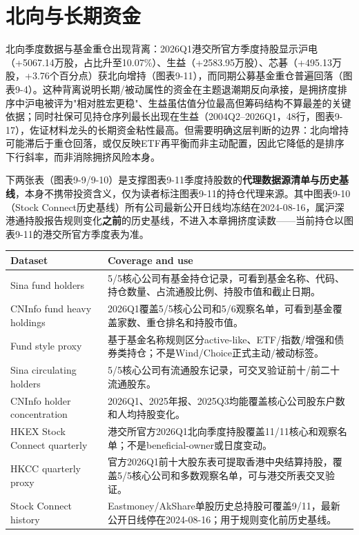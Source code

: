 \section{北向与长期资金}

北向季度数据与基金重仓出现背离：2026Q1港交所官方季度持股显示沪电（+5067.14万股，占比升至10.07\%）、生益（+2583.95万股）、芯碁（+495.13万股，+3.76个百分点）获北向增持（图表9-11），而同期公募基金重仓普遍回落（图表9-4）。这种背离说明长期/被动属性的资金在主题退潮期反向承接，是拥挤度排序中沪电被评为"相对胜宏更稳"、生益虽估值分位最高但筹码结构不算最差的关键依据；同时社保可见持仓序列最长出现在生益（2004Q2–2026Q1，48行，图表9-17），佐证材料龙头的长期资金粘性最高。但需要明确这层判断的边界：北向增持可能滞后于重仓回落，或仅反映ETF再平衡而非主动配置，因此它降低的是排序下行斜率，而非消除拥挤风险本身。

下两张表（图表9-9/9-10）是支撑图表9-11季度持股数的\textbf{代理数据源清单与历史基线}，本身不携带投资含义，仅为读者标注图表9-11的持仓代理来源。其中图表9-10（Stock Connect历史基线）所有公司最新公开日线均冻结在2024-08-16，属沪深港通持股报告规则变化\textbf{之前}的历史基线，不进入本章拥挤度读数——当前持仓以图表9-11的港交所官方季度表为准。

\begin{exhibitbox}
\small
\begin{tabularx}{\textwidth}{L{2.4cm}X}
\toprule
\textbf{Dataset} & \textbf{Coverage and use} \\
\midrule
Sina fund holders & 5/5核心公司有基金持仓记录，可看到基金名称、代码、持仓数量、占流通股比例、持股市值和截止日期。 \\
CNInfo fund heavy holdings & 2026Q1覆盖5/5核心公司和5/6观察名单，可看到基金覆盖家数、重仓排名和持股市值。 \\
Fund style proxy & 基于基金名称规则区分active-like、ETF/指数/增强和债券类持仓；不是Wind/Choice正式主动/被动标签。 \\
Sina circulating holders & 5/5核心公司有流通股东记录，可交叉验证前十/前二十流通股东。 \\
CNInfo holder concentration & 2026Q1、2025年报、2025Q3均能覆盖核心公司股东户数和人均持股变化。 \\
HKEX Stock Connect quarterly & 港交所官方2026Q1北向季度持股覆盖11/11核心和观察名单；不是beneficial-owner或日度变动。 \\
HKCC quarterly proxy & 官方2026Q1前十大股东表可提取香港中央结算持股，覆盖5/5核心公司和多数观察名单，可与港交所表交叉验证。 \\
Stock Connect history & Eastmoney/AkShare单股历史总持股可覆盖9/11，最新公开日线停在2024-08-16；用于规则变化前历史基线。 \\
\bottomrule
\end{tabularx}
\end{exhibitbox}

